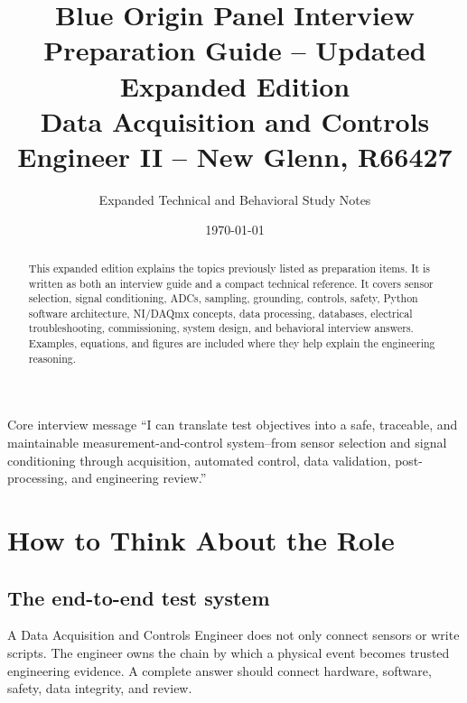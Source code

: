 \documentclass[11pt]{article}
\title{\textbf{Blue Origin Panel Interview Preparation Guide -- Updated Expanded Edition}\\
\large Data Acquisition and Controls Engineer II -- New Glenn, R66427}
\author{Expanded Technical and Behavioral Study Notes}
\date{\today}
\begin{document}
\maketitle

\begin{abstract}
This expanded edition explains the topics previously listed as preparation
items. It is written as both an interview guide and a compact technical
reference. It covers sensor selection, signal conditioning, ADCs, sampling,
grounding, controls, safety, Python software architecture, NI/DAQmx concepts,
data processing, databases, electrical troubleshooting, commissioning, system
design, and behavioral interview answers. Examples, equations, and figures are
included where they help explain the engineering reasoning.
\end{abstract}

\begin{keybox}{Core interview message}
``I can translate test objectives into a safe, traceable, and maintainable
measurement-and-control system--from sensor selection and signal conditioning
through acquisition, automated control, data validation, post-processing, and
engineering review.''
\end{keybox}

\tableofcontents
\newpage

\section{How to Think About the Role}

\subsection{The end-to-end test system}
A Data Acquisition and Controls Engineer does not only connect sensors or write
scripts. The engineer owns the chain by which a physical event becomes trusted
engineering evidence. A complete answer should connect hardware, software,
safety, data integrity, and review.

\begin{center}
\end{center}
\end{document}
